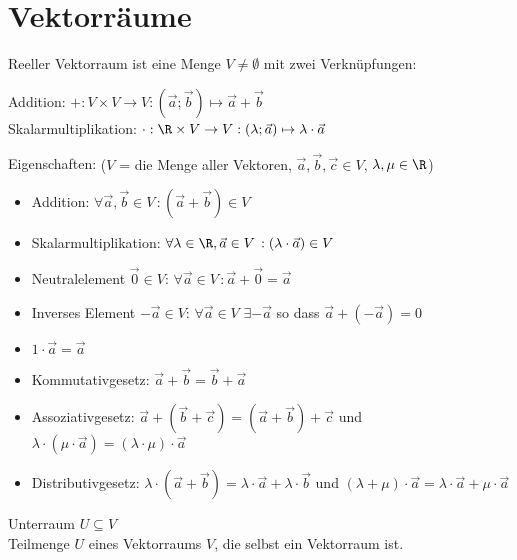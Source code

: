 \graphicspath{{images/}}

\section{Vektorräume}




    \begin{definition}{Reeller Vektorraum}
        ist eine Menge $V\neq\emptyset$ mit zwei Verknüpfungen:
        \begin{center}
        Addition: $+ : V\times V\rightarrow V : (\vec{a};\vec{b})\mapsto\vec{a}+\vec{b}$ \\
        Skalarmultiplikation: $\cdot : \R\times V\rightarrow V : (\lambda;\vec{a})\mapsto\lambda\cdot\vec{a}$
        \end{center}
        Eigenschaften: {\small ($V$ = die Menge aller Vektoren, $\vec{a},\vec{b},\vec{c}\in V$, $\lambda,\mu\in \R$)}
        \begin{itemize}
            \item Addition: $\forall \vec{a},\vec{b}\in V\,:(\vec{a}+\vec{b})\in V$
            \item Skalarmultiplikation: $\forall \lambda\in \R, \vec{a}\in V\,:(\lambda\cdot\vec{a})\in V$
            \item Neutralelement $\vec{0}\in V$: $\forall \vec{a}\in V\,:\vec{a}+\vec{0}=\vec{a}$
            \item Inverses Element $-\vec{a}\in V$: $\forall \vec{a}\in V$ $\exists-\vec{a}$ so dass $\vec{a}+(-\vec{a})=0$
            \item $1\cdot\vec{a}=\vec{a}$
            \item Kommutativgesetz: $\vec{a}+\vec{b}=\vec{b}+\vec{a}$
            \item Assoziativgesetz:
                $\vec{a}+(\vec{b}+\vec{c})=(\vec{a}+\vec{b})+\vec{c}$ und
                $\lambda\cdot(\mu\cdot\vec{a})=(\lambda\cdot\mu)\cdot\vec{a}$
            \item Distributivgesetz: 
                $\lambda\cdot(\vec{a}+\vec{b})=\lambda\cdot\vec{a}+\lambda\cdot\vec{b}$ und
                $(\lambda+\mu)\cdot\vec{a}=\lambda\cdot\vec{a}+\mu\cdot\vec{a}$
        \end{itemize}
    \end{definition}

    \begin{definition}{Unterraum} $U\subseteq V$\\
        Teilmenge $U$ eines Vektorraums $V$, die selbst ein Vektorraum ist.
    \end{definition}

